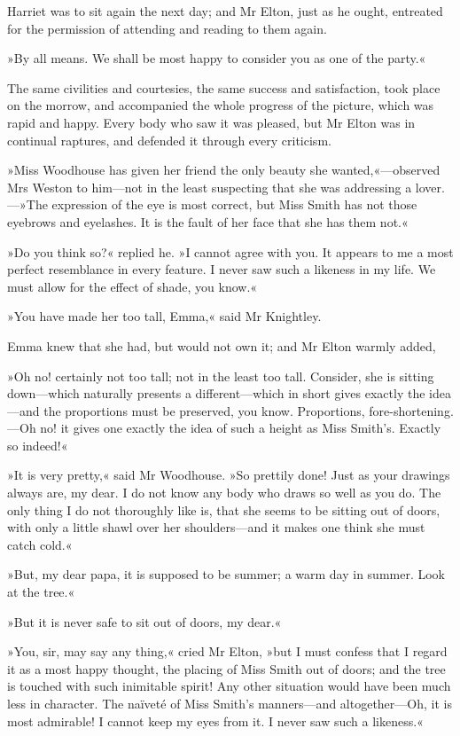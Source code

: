 Harriet was to sit again the next day; and Mr Elton, just as he ought, entreated for the permission of attending and reading to them again.

»By all means. We shall be most happy to consider you as one of the party.«

The same civilities and courtesies, the same success and satisfaction, took place on the morrow, and accompanied the whole progress of the picture, which was rapid and happy. Every body who saw it was pleased, but Mr Elton was in continual raptures, and defended it through every criticism.

»Miss Woodhouse has given her friend the only beauty she wanted,«—observed Mrs Weston to him—not in the least suspecting that she was addressing a lover.—»The expression of the eye is most correct, but Miss Smith has not those eyebrows and eyelashes. It is the fault of her face that she has them not.«

»Do you think so?« replied he. »I cannot agree with you. It appears to me a most perfect resemblance in every feature. I never saw such a likeness in my life. We must allow for the effect of shade, you know.«

»You have made her too tall, Emma,« said Mr Knightley.

Emma knew that she had, but would not own it; and Mr Elton warmly added,

»Oh no! certainly not too tall; not in the least too tall. Consider, she is sitting down—which naturally presents a different—which in short gives exactly the idea—and the proportions must be preserved, you know. Proportions, fore-shortening.—Oh no! it gives one exactly the idea of such a height as Miss Smith's. Exactly so indeed!«

»It is very pretty,« said Mr Woodhouse. »So prettily done! Just as your drawings always are, my dear. I do not know any body who draws so well as you do. The only thing I do not thoroughly like is, that she seems to be sitting out of doors, with only a little shawl over her shoulders—and it makes one think she must catch cold.«

»But, my dear papa, it is supposed to be summer; a warm day in summer. Look at the tree.«

»But it is never safe to sit out of doors, my dear.«

»You, sir, may say any thing,« cried Mr Elton, »but I must confess that I regard it as a most happy thought, the placing of Miss Smith out of doors; and the tree is touched with such inimitable spirit! Any other situation would have been much less in character. The naïveté of Miss Smith's manners—and altogether—Oh, it is most admirable! I cannot keep my eyes from it. I never saw such a likeness.«

